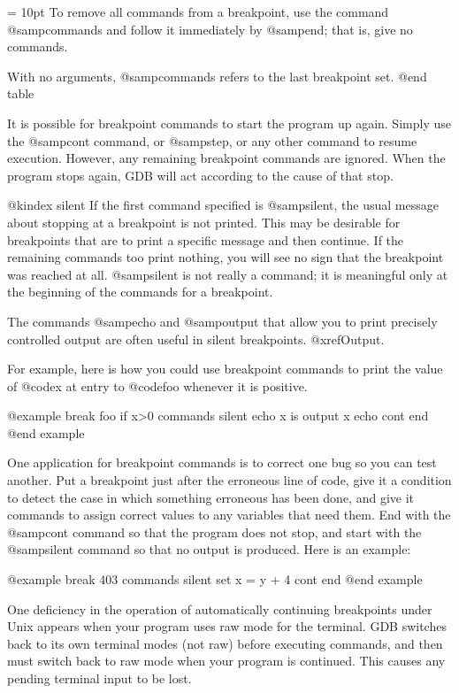 \hfuzz = 10pt
To remove all commands from a breakpoint, use the command
@samp{commands} and follow it immediately by @samp{end}; that is, give
no commands.

With no arguments, @samp{commands} refers to the last breakpoint set.
@end table

It is possible for breakpoint commands to start the program up again.
Simply use the @samp{cont} command, or @samp{step}, or any other command
to resume execution.  However, any remaining breakpoint commands are
ignored.  When the program stops again, GDB will act according to the
cause of that stop.

@kindex silent
If the first command specified is @samp{silent}, the usual message about
stopping at a breakpoint is not printed.  This may be desirable for
breakpoints that are to print a specific message and then continue.
If the remaining commands too print nothing, you will see no sign that
the breakpoint was reached at all.  @samp{silent} is not really a command;
it is meaningful only at the beginning of the commands for a breakpoint.

The commands @samp{echo} and @samp{output} that allow you to print precisely
controlled output are often useful in silent breakpoints.  @xref{Output}.

For example, here is how you could use breakpoint commands to print the
value of @code{x} at entry to @code{foo} whenever it is positive.

@example
break foo if x>0
commands
silent
echo x is
output x
echo \n
cont
end
@end example

One application for breakpoint commands is to correct one bug so you can
test another.  Put a breakpoint just after the erroneous line of code, give
it a condition to detect the case in which something erroneous has been
done, and give it commands to assign correct values to any variables that
need them.  End with the @samp{cont} command so that the program does not
stop, and start with the @samp{silent} command so that no output is
produced.  Here is an example:

@example
break 403
commands
silent
set x = y + 4
cont
end
@end example

One deficiency in the operation of automatically continuing breakpoints
under Unix appears when your program uses raw mode for the terminal.
GDB switches back to its own terminal modes (not raw) before executing
commands, and then must switch back to raw mode when your program is
continued.  This causes any pending terminal input to be lost.

